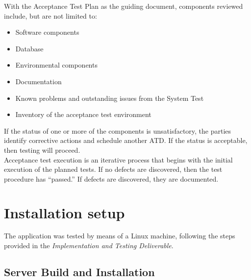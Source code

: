 \documentclass[a4paper, hidelinks, 12pt]{report}
\begin{document}
With the Acceptance Test Plan as the guiding document, components reviewed include, but are not limited to:
\begin{itemize}
\item{}Software components
\item{}Database
\item{}Environmental components
\item{}Documentation
\item{}Known problems and outstanding issues from the System Test
\item{}Inventory of the acceptance test environment

\end{itemize}
If the status of one or more of the components is unsatisfactory, the parties identify corrective actions and schedule another ATD.  If the status is acceptable, then testing will proceed.\\
Acceptance test execution is an iterative process that begins with the initial execution of the planned tests.  If no defects are discovered, then the test procedure has “passed.” If defects are discovered, they are documented.

	\chapter{Installation setup}

	The application was tested by means of a Linux machine, following the steps provided in the \textit{Implementation and Testing Deliverable}. 
	
	\section{Server Build and Installation}
	
\end{document}
